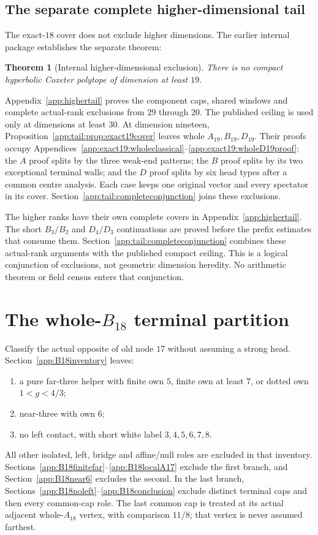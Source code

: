\documentclass[11pt]{article}
\newtheorem{theorem}{Theorem}[section]
\theoremstyle{definition}
\theoremstyle{remark}
\begin{document}
\subsection{The separate complete higher-dimensional tail}
\label{subsec:higher}
The exact-\(18\) cover does not exclude higher dimensions.
The earlier internal package establishes the separate theorem:
\begin{theorem}[Internal higher-dimensional exclusion]
\label{thm:tail}
There is no compact hyperbolic Coxeter polytope of dimension at least \(19\).
\end{theorem}
Appendix~\ref{app:highertail} proves the component caps, shared
windows and complete actual-rank exclusions from \(29\) through \(20\).
The published ceiling is used only at dimensions at least \(30\).
At dimension nineteen, Proposition~\ref{app:tail:prop:exact19cover}
leaves whole \(A_{19},B_{19},D_{19}\). Their proofs occupy
Appendices~\ref{app:exact19:wholeclassical}--\ref{app:exact19:wholeD19proof}:
the \(A\) proof splits by the three weak-end patterns; the \(B\)
proof splits by its two exceptional terminal walls; and the \(D\)
proof splits by six head types after a common centre analysis.
Each case keeps one original vector and every spectator in its cover.
Section~\ref{app:tail:completeconjunction} joins these exclusions.

The higher ranks have their own complete covers in
Appendix~\ref{app:highertail}. The short \(B_3/B_2\) and \(D_4/D_3\)
continuations are proved before the prefix estimates that consume them.
Section~\ref{app:tail:completeconjunction} combines these actual-rank
arguments with the published compact ceiling. This is a logical
conjunction of exclusions, not geometric dimension heredity.
No arithmetic theorem or field census enters that conjunction.

\section[The whole-B18 terminal partition]{The whole-\(B_{18}\) terminal partition}
\label{sec:b18}
Classify the actual opposite of old node \(17\) without assuming
a strong head. Section~\ref{app:B18inventory} leaves:
\begin{enumerate}[label=(\roman*)]
\item a pure far-three helper with finite own \(5\), finite own
 at least \(7\), or dotted own \(1<g<4/3\);
\item near-three with own \(6\);
\item no left contact, with short white label \(3,4,5,6,7,8\).
\end{enumerate}
All other isolated, left, bridge and affine/null roles are excluded
in that inventory. Sections~\ref{app:B18finitefar}--\ref{app:B18localA17}
exclude the first branch, and Section~\ref{app:B18near6} excludes
the second. In the last branch, Sections~\ref{app:B18noleft}--\ref{app:B18conclusion}
exclude distinct terminal caps and then every common-cap role.
The last common cap is treated at its actual adjacent whole-\(A_{18}\)
vertex, with comparison \(11/8\); that vertex is never assumed farthest.
\end{document}

